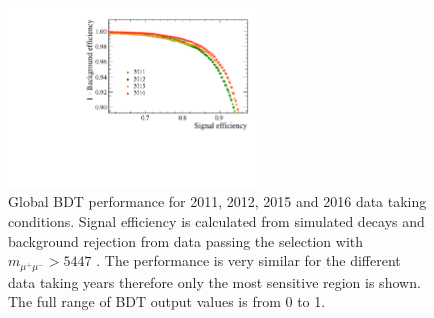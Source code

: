 \begin{figure}[htbp]
    \centering
       \includegraphics[width=0.6\textwidth]{./Figs/Selection/ROC_zoom.pdf}
        \caption{Global BDT performance for 2011, 2012, 2015 and 2016 data taking conditions. Signal efficiency is calculated from \bsmumu simulated decays and background rejection from data passing the \bsmumu selection with $m_{\mu^{+}\mu^{-}} > 5447$ \mevcc. The performance is very similar for the different data taking years therefore only the most sensitive region is shown. The full range of BDT output values is from 0 to 1.}
    \label{fig:BDTperformance}
\end{figure}


